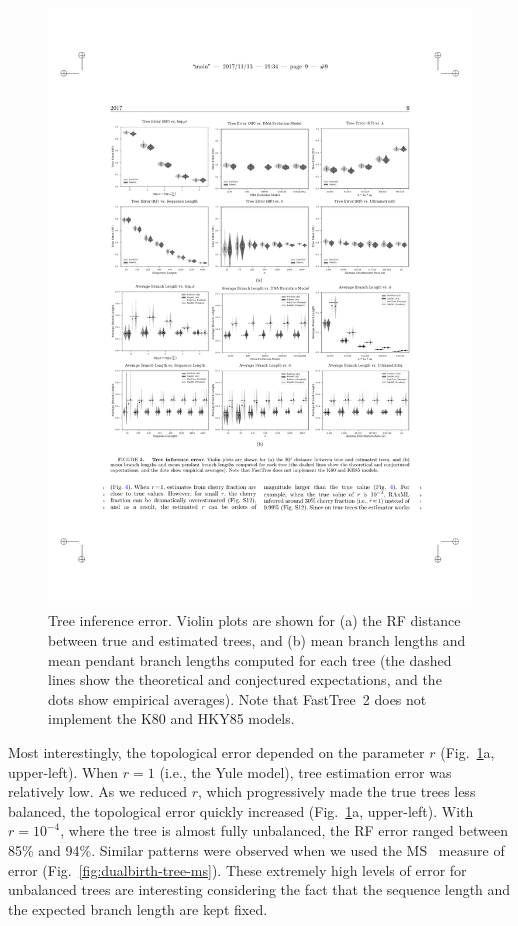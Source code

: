 \begin{figure} %
\centering
\includegraphics[width=\textwidth]{figs/dualbirth-tree-inference-error}
\caption[Tree Inference Error]
{Tree inference error. Violin plots are shown for (a) the \gls{RF} distance between true and estimated trees, and (b) mean branch lengths and mean pendant branch lengths computed for each tree (the dashed lines show the theoretical and conjectured expectations, and the dots show empirical averages). Note that FastTree~2 does not implement the \gls{K80} and \gls{HKY85} models.}
\label{fig:dualbirth-tree-inference-error}
\end{figure}

Most interestingly, the topological error depended on the parameter $r$ (Fig.~\ref{fig:dualbirth-tree-inference-error}a, upper-left). When $r=1$ (i.e., the Yule model), tree estimation error was relatively low. As we reduced $r$, which progressively made the true trees less balanced, the topological error quickly increased (Fig.~\ref{fig:dualbirth-tree-inference-error}a, upper-left). With $r=10^{-4}$, where the tree is almost fully unbalanced, the \gls{RF} error ranged between 85\% and 94\%. Similar patterns were observed when we used the \gls{MS}~\cite{Bogdanowicz2012} measure of error (Fig.~\ref{fig:dualbirth-tree-ms}). These extremely high levels of error for unbalanced trees are interesting considering the fact that the sequence length and the expected branch length are kept fixed.

